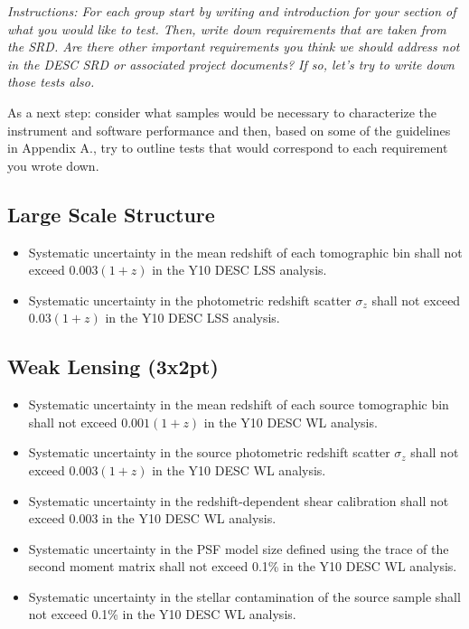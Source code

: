 \documentclass[modern]{desc-tex/styles/lsstdescnote}
\begin{document}
{\it Instructions: For each group start by writing and introduction for your section of what you would like to test.  Then, write down requirements that are taken from the SRD.  Are there other important requirements you think we should address  not in the DESC SRD or associated project documents?  If so, let's try to write down those tests also.

As a next step: consider what samples would be necessary to characterize the instrument and software performance and then, based on some of the guidelines in Appendix A., try to outline tests that would correspond to each requirement you wrote down. }

\subsection{Large Scale Structure}

\begin{itemize}
\item Systematic uncertainty in the mean redshift of each tomographic bin shall not exceed $0.003 (1 + z)$ in the Y10 DESC LSS analysis.
\item Systematic uncertainty in the photometric redshift scatter $\sigma_z$ shall not exceed $0.03 (1 + z)$ in the Y10 DESC LSS analysis.
\end{itemize}

\subsection{Weak Lensing (3x2pt)}

\begin{itemize}
\item Systematic uncertainty in the mean redshift of each source tomographic bin shall not exceed $0.001 (1 + z)$ in the Y10 DESC WL analysis.
\item Systematic uncertainty in the source photometric redshift scatter $\sigma_z$  shall not exceed $0.003 (1 + z) $ in the Y10 DESC WL analysis.
\item Systematic uncertainty in the redshift-dependent shear calibration shall not exceed 0.003 in the Y10 DESC WL analysis.
\item Systematic uncertainty in the PSF model size defined using the trace of the second moment matrix shall not exceed 0.1\% in the Y10 DESC WL analysis.
\item Systematic uncertainty in the stellar contamination of the source sample shall not exceed 0.1\% in the Y10 DESC WL analysis.
\end{itemize}
\end{document}

